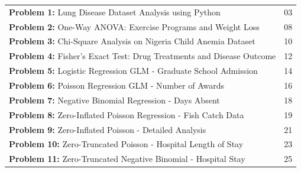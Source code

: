 \documentclass[12pt, a4paper]{article}
\begin{document}
\begin{center}
    \begin{tcolorbox}[
        colback=Parchment, 
        colframe=RoyalNavy, 
        width=0.9\textwidth, 
        arc=0mm, 
        boxrule=1.5pt, 
        leftrule=4pt, %
        titlerule=1pt,
        title={\centering\Huge\bfseries\scshape Table of Contents},
        coltitle=white,
        colbacktitle=RoyalNavy,
        fonttitle=\bfseries,
        bottomrule=1.5pt,
        toprule=1.5pt
    ]
    \vspace{0.8cm}
    \renewcommand{\arraystretch}{1.6} %
    \begin{tabular}{p{} r}
        \textbf{\color{RoyalNavy}Problem 1:} Lung Disease Dataset Analysis using Python & 03 \\
        \textbf{\color{RoyalNavy}Problem 2:} One-Way ANOVA: Exercise Programs and Weight Loss & 08 \\
        \textbf{\color{RoyalNavy}Problem 3:} Chi-Square Analysis on Nigeria Child Anemia Dataset & 10 \\
        \textbf{\color{RoyalNavy}Problem 4:} Fisher's Exact Test: Drug Treatments and Disease Outcome & 12 \\
        \textbf{\color{RoyalNavy}Problem 5:} Logistic Regression GLM - Graduate School Admission & 14\\
        \textbf{\color{RoyalNavy}Problem 6:} Poisson Regression GLM - Number of Awards & 16\\
        \textbf{\color{RoyalNavy}Problem 7:} Negative Binomial Regression - Days Absent & 18\\
        \textbf{\color{RoyalNavy}Problem 8:} Zero-Inflated Poisson Regression - Fish Catch Data & 19\\
        \textbf{\color{RoyalNavy}Problem 9:} Zero-Inflated Poisson - Detailed Analysis & 21\\
        \textbf{\color{RoyalNavy}Problem 10:} Zero-Truncated Poisson - Hospital Length of Stay & 23\\
        \textbf{\color{RoyalNavy}Problem 11:} Zero-Truncated Negative Binomial - Hospital Stay & 25\\
    \end{tabular}
    \vspace{0.5cm}
    \end{tcolorbox}
\end{center}
\end{document}
